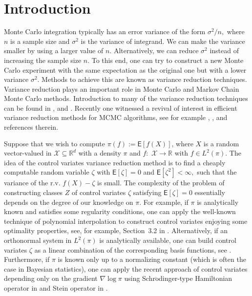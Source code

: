 \documentclass[bj]{imsart}
\begin{document}
\section{Introduction}

Monte Carlo integration typically has an error variance of the form
$\sigma^{2}/n,$ where $n$ is a sample size and \(\sigma^2\) is the variance of  integrand. We can make the variance smaller
by using a larger value of $n$.  Alternatively,
 we can  reduce $\sigma^2$ instead of increasing the sample size \(n\). To this end, one can try to construct
a new Monte Carlo experiment with the same expectation as the original one
but with a lower variance $\sigma^2$. Methods to achieve this are known as variance
reduction techniques. Variance reduction plays an important role in
Monte Carlo and Markov Chain Monte Carlo methods. Introduction to many of the variance reduction techniques can be found in \cite{rubinstein2016simulation}, \cite{GobetBook} and \cite{glasserman2013monte}. Recently one witnessed a revival of interest in efficient variance reduction methods  for MCMC algorithms, see for example \cite{dellaportas2012control}, \cite{mira2013zero}, \cite{brosse2018diffusion} and references therein.
\par
Suppose that we wish to compute $\pi(f):=\mathsf{E}\left[f(X)\right]$, where $X$
is a random vector-valued in $\mathcal{X}\subseteq\mathbb{R}^{d}$ with a density $\pi$ and $f:$
$\mathcal{X}\to\mathbb{R}$ with $f\in L^2(\pi)$.
The idea of the control variates variance reduction method
 is to find a cheaply computable random variable $\zeta$ with $\mathsf{E}[\zeta]=0$ and \(\mathsf{E}[\zeta^2]<\infty,\)
such that the variance of the r.v. $f(X)-\zeta$ is small.  The complexity of the problem of constructing classes $Z$ of control variates \(\zeta\) satisfying   $\mathsf{E}[\zeta]=0$ essentially depends on the degree of our knowledge on \(\pi.\)
For example, if \(\pi\) is analytically known and satisfies some regularity conditions, one can apply the well-known technique of  polynomial interpolation to construct control variates enjoying  some optimality properties, see, for example, Section~3.2 in \cite{dimov2008monte}. Alternatively, if an orthonormal system in \(L^2(\pi)\) is analytically available, one can build control variates \(\zeta\) as a linear combination of the corresponding basis functions, see \cite{GobetCV}. Furthermore, if \(\pi\) is known only up to a normalizing constant (which is often the case in Bayesian statistics), one can apply the recent approach of control variates  depending only on the gradient \(\nabla \log \pi\)  using Schr\(\ddot{\text{o}}\)dinger-type Hamiltonian operator in  \cite{mira2013zero} and Stein operator in \cite{brosse2018diffusion}.
\end{document}
